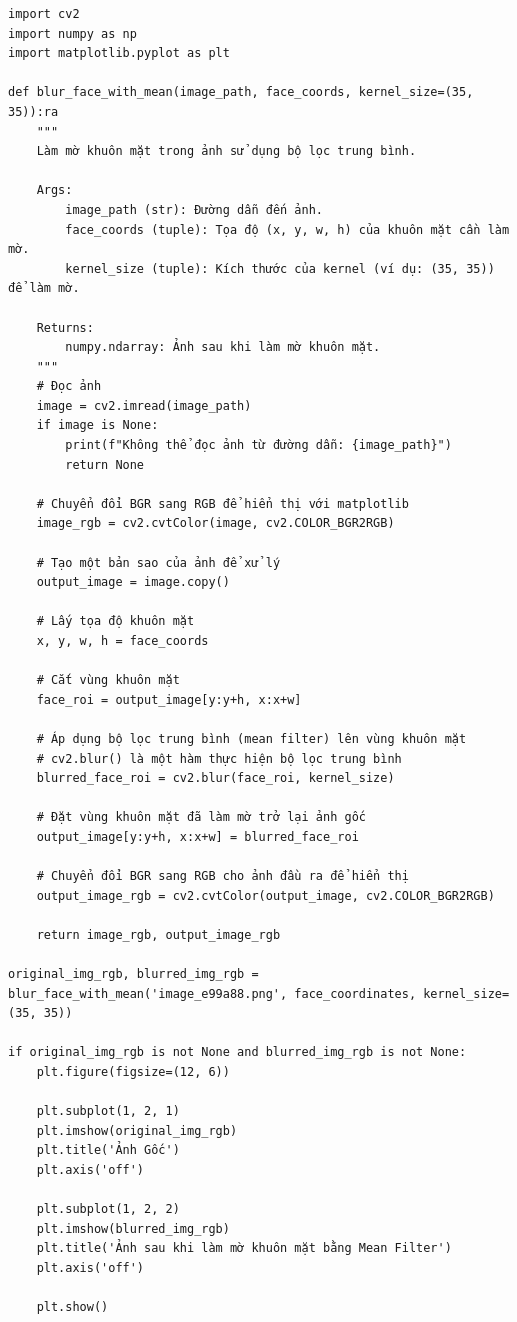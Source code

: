\documentclass[11pt]{article}
\begin{document}
\begin{verbatim}
import cv2
import numpy as np
import matplotlib.pyplot as plt

def blur_face_with_mean(image_path, face_coords, kernel_size=(35, 35)):ra
    """
    Làm mờ khuôn mặt trong ảnh sử dụng bộ lọc trung bình.

    Args:
        image_path (str): Đường dẫn đến ảnh.
        face_coords (tuple): Tọa độ (x, y, w, h) của khuôn mặt cần làm mờ.
        kernel_size (tuple): Kích thước của kernel (ví dụ: (35, 35)) để làm mờ.

    Returns:
        numpy.ndarray: Ảnh sau khi làm mờ khuôn mặt.
    """
    # Đọc ảnh
    image = cv2.imread(image_path)
    if image is None:
        print(f"Không thể đọc ảnh từ đường dẫn: {image_path}")
        return None

    # Chuyển đổi BGR sang RGB để hiển thị với matplotlib
    image_rgb = cv2.cvtColor(image, cv2.COLOR_BGR2RGB)
    
    # Tạo một bản sao của ảnh để xử lý
    output_image = image.copy()

    # Lấy tọa độ khuôn mặt
    x, y, w, h = face_coords

    # Cắt vùng khuôn mặt
    face_roi = output_image[y:y+h, x:x+w]

    # Áp dụng bộ lọc trung bình (mean filter) lên vùng khuôn mặt
    # cv2.blur() là một hàm thực hiện bộ lọc trung bình
    blurred_face_roi = cv2.blur(face_roi, kernel_size)

    # Đặt vùng khuôn mặt đã làm mờ trở lại ảnh gốc
    output_image[y:y+h, x:x+w] = blurred_face_roi

    # Chuyển đổi BGR sang RGB cho ảnh đầu ra để hiển thị
    output_image_rgb = cv2.cvtColor(output_image, cv2.COLOR_BGR2RGB)

    return image_rgb, output_image_rgb

original_img_rgb, blurred_img_rgb = blur_face_with_mean('image_e99a88.png', face_coordinates, kernel_size=(35, 35))

if original_img_rgb is not None and blurred_img_rgb is not None:
    plt.figure(figsize=(12, 6))

    plt.subplot(1, 2, 1)
    plt.imshow(original_img_rgb)
    plt.title('Ảnh Gốc')
    plt.axis('off')

    plt.subplot(1, 2, 2)
    plt.imshow(blurred_img_rgb)
    plt.title('Ảnh sau khi làm mờ khuôn mặt bằng Mean Filter')
    plt.axis('off')

    plt.show()
\end{verbatim}
\end{document}
